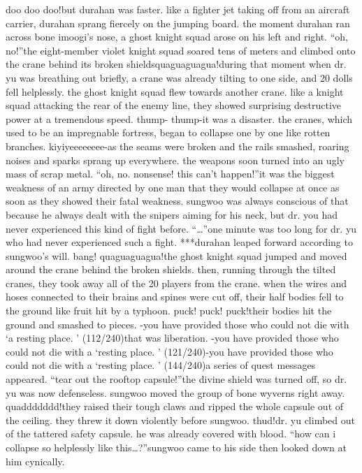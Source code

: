 doo doo doo!but durahan was faster.
 like a fighter jet taking off from an aircraft carrier, durahan sprang fiercely on the jumping board.
 the moment durahan ran across bone imoogi’s nose, a ghost knight squad arose on his left and right.
“oh, no!”the eight-member violet knight squad soared tens of meters and climbed onto the crane behind its broken shieldsquaguaguagua!during that moment when dr.
 yu was breathing out briefly, a crane was already tilting to one side, and 20 dolls fell helplessly.
the ghost knight squad flew towards another crane.
 like a knight squad attacking the rear of the enemy line, they showed surprising destructive power at a tremendous speed.
thump- thump-it was a disaster.
 the cranes, which used to be an impregnable fortress, began to collapse one by one like rotten branches.
kiyiyeeeeeeee-as the seams were broken and the rails smashed, roaring noises and sparks sprang up everywhere.
 the weapons soon turned into an ugly mass of scrap metal.
“oh, no.
 nonsense! this can’t happen!”it was the biggest weakness of an army directed by one man that they would collapse at once as soon as they showed their fatal weakness.
sungwoo was always conscious of that because he always dealt with the snipers aiming for his neck, but dr.
 you had never experienced this kind of fight before.
“…”one minute was too long for dr.
 yu who had never experienced such a fight.
***durahan leaped forward according to sungwoo’s will.
bang! quaguaguagua!the ghost knight squad jumped and moved around the crane behind the broken shields.
 then, running through the tilted cranes, they took away all of the 20 players from the crane.
when the wires and hoses connected to their brains and spines were cut off, their half bodies fell to the ground like fruit hit by a typhoon.
puck! puck! puck!their bodies hit the ground and smashed to pieces.
-you have provided those who could not die with ‘a resting place.
’ (112/240)that was liberation.
-you have provided those who could not die with a ‘resting place.
’ (121/240)-you have provided those who could not die with a ‘resting place.
’ (144/240)a series of quest messages appeared.
“tear out the rooftop capsule!”the divine shield was turned off, so dr.
 yu was now defenseless.
sungwoo moved the group of bone wyverns right away.
quaddddddd!they raised their tough claws and ripped the whole capsule out of the ceiling.
 they threw it down violently before sungwoo.
thud!dr.
 yu climbed out of the tattered safety capsule.
 he was already covered with blood.
“how can i collapse so helplessly like this…?”sungwoo came to his side then looked down at him cynically.
